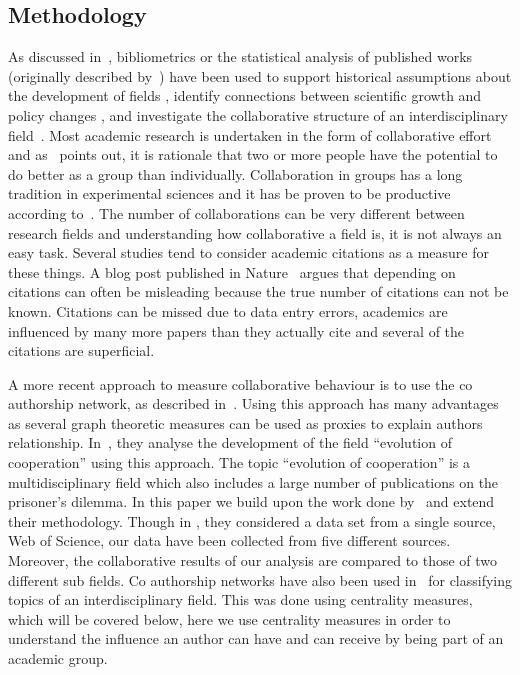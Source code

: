 \documentclass{article}
\theoremstyle{definition}
\begin{document}
\subsection{Methodology}\label{section:methodology}

As discussed in~\cite{youngblood2018}, bibliometrics or the statistical analysis
of published works (originally described by~\cite{pritchard1969}) 
have been used to support historical assumptions about the development of fields
\cite{raina1998}, identify connections between scientific growth and policy changes 
\cite{das2016}, and investigate the collaborative structure of an interdisciplinary
field~\cite{Liu2015}.
Most academic research is undertaken in the form of collaborative effort and as~\cite{Kyvik2017}
points out, it is rationale that two or more people have the potential to do better
as a group than individually. Collaboration in groups has a long tradition in experimental 
sciences and it has be proven to be productive according to~\cite{Etzkowitz1992}.
The number of collaborations can be very different between research fields and
understanding how collaborative a field is, it is not always an easy task.
Several studies tend to consider academic citations as a measure for these things.
A blog post published in Nature~\cite{nature_blog} argues that depending on citations
can often be misleading because the true number of citations can not be
known. Citations can be missed due to data entry errors, academics are influenced
by many more papers than they actually cite and several of the citations are
superficial.

A more recent approach to measure collaborative behaviour is to use the co
authorship network, as described in~\cite{Liu2015}. Using this approach has many
advantages as several graph theoretic measures can be used as proxies to explain
authors relationship. In~\cite{Liu2015}, they analyse the development of the field
``evolution of cooperation'' using this approach. The topic ``evolution of cooperation''
is a multidisciplinary field which also includes a large number of publications
on the prisoner's dilemma. In this paper we build upon
the work done by~\cite{Liu2015} and extend their methodology. Though in
\cite{Liu2015}, they considered a data set from a single source, Web of Science,
our data have been collected from five different sources. Moreover, the collaborative
results of our analysis are compared to those of two different sub fields.
Co authorship networks have also been used in~\cite{youngblood2018} for classifying
topics of an interdisciplinary field. This was done using centrality measures,
which will be covered below, here we use centrality measures in order to understand
the influence an author can have and can receive by being part of an academic group.
\end{document}
